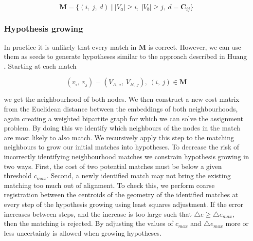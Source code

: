 \begin{equation}
    \label{eq:M}
    \mathbf{M} = \{(i,\ j,\ d) \mid  |V_a| \geq i,\ |V_b|\geq j,\ d = \mathbf{C}_{ij}\}
\end{equation}

\subsubsection{Hypothesis growing}

In practice it is unlikely that every match in \(\mathbf{M}\) is correct. However, we can use them as seeds to generate hypotheses similar to the approach described in Huang \citep{huang_topological_2005}. Starting at each match 

\begin{equation}
    \label{eq:init_match}
    (v_i,\ v_j) = (V_{A,\ i},\ V_{B,\ j}),\ (i,\ j) \in \mathbf{M}
\end{equation}


we get the neighbourhood of both nodes. We then construct a new cost matrix from the Euclidean distance between the embeddings of both neighbourhoods, again creating a weighted bipartite graph for which we can solve the assignment problem. By doing this we identify which neighbours of the nodes in the match are most likely to also match. We recursively apply this step to the matching neighbours to grow our initial matches into hypotheses. To decrease the risk of incorrectly identifying neighbourhood matches we constrain hypothesis growing in two ways. First, the cost of two potential matches must be below a given threshold \(c_{max}\). Second, a newly identified match may not bring the existing matching too much out of alignment. To check this, we perform coarse registration between the centroids of the geometry of the identified matches at every step of the hypothesis growing using least squares adjustment. If the error increases between steps, and the increase is too large such that \(\triangle e \geq \triangle e_{max} \), then the matching is rejected. By adjusting the values of \(c_{max}\) and \(\triangle e_{max}\) more or less uncertainty is allowed when growing hypotheses.
